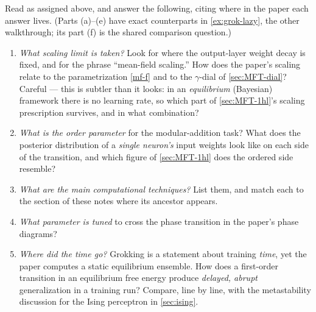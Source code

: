 \documentclass[11pt]{article}
\begin{document}
\begin{exercise}
\label{ex:grok}
Read \cite{rubin2024grokking} as assigned above, and answer the following, citing where in the paper each answer lives. (Parts (a)--(e) have exact counterparts in \cref{ex:grok-lazy}, the other walkthrough; its part (f) is the shared comparison question.)
\begin{enumerate}
    \item\label{ex:grok-limit} \emph{What scaling limit is taken?} Look for where the output-layer weight decay is fixed, and for the phrase ``mean-field scaling.'' How does the paper's scaling relate to the parametrization \eqref{mf-f} and to the $\gamma$-dial of \cref{sec:MFT-dial}? Careful --- this is subtler than it looks: in an \emph{equilibrium} (Bayesian) framework there is no learning rate, so which part of \cref{sec:MFT-1hl}'s scaling prescription survives, and in what combination?
    \item\label{ex:grok-order} \emph{What is the order parameter} for the modular-addition task? What does the posterior distribution of a \emph{single neuron's} input weights look like on each side of the transition, and which figure of \cref{sec:MFT-1hl} does the ordered side resemble?
    \item \emph{What are the main computational techniques?} List them, and match each to the section of these notes where its ancestor appears.
    \item\label{ex:grok-dial} \emph{What parameter is tuned} to cross the phase transition in the paper's phase diagrams?
    \item \emph{Where did the time go?} Grokking is a statement about training \emph{time}, yet the paper computes a static equilibrium ensemble. How does a first-order transition in an equilibrium free energy produce \emph{delayed, abrupt} generalization in a training run? Compare, line by line, with the metastability discussion for the Ising perceptron in \cref{sec:ising}.
\end{enumerate}
\end{exercise}


\end{document}
